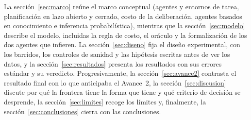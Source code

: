 La sección~\ref{sec:marco} reúne el marco conceptual (agentes y entornos de tarea, planificación en lazo abierto y cerrado, costo de la deliberación, agentes basados en conocimiento e inferencia probabilística), mientras que la sección~\ref{sec:modelo} describe el modelo, incluidas la regla de costo, el oráculo y la formalización de los dos agentes que infieren. La sección~\ref{sec:diseno} fija el diseño experimental, con los barridos, los controles de sanidad y las hipótesis escritas antes de ver los datos, y la sección~\ref{sec:resultados} presenta los resultados con sus errores estándar y su veredicto. Progresivamente, la sección~\ref{sec:avance2} contrasta el resultado final con lo que anticipaba el Avance~2, la sección~\ref{sec:discusion} discute por qué la frontera tiene la forma que tiene y qué criterio de decisión se desprende, la sección~\ref{sec:limites} recoge los límites y, finalmente, la sección~\ref{sec:conclusiones} cierra con las conclusiones.
